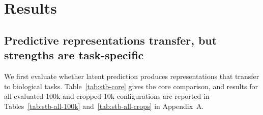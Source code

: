 \documentclass{article}
\begin{document}
\section{Results}
\label{sec:results}

\subsection{Predictive representations transfer, but strengths are task-specific}

We first evaluate whether latent prediction produces representations that transfer to biological tasks.
Table~\ref{tab:stb-core} gives the core comparison, and results for all evaluated 100k and cropped 10k configurations are reported in Tables~\ref{tab:stb-all-100k} and~\ref{tab:stb-all-crops} in Appendix~A.
\end{document}
